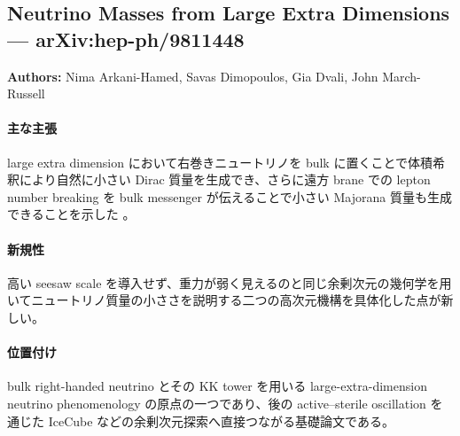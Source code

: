 \subsection{Neutrino Masses from Large Extra Dimensions --- arXiv:hep-ph/9811448}

\textbf{Authors:} Nima Arkani-Hamed, Savas Dimopoulos, Gia Dvali, John March-Russell

\paragraph{主な主張}
large extra dimension において右巻きニュートリノを bulk に置くことで体積希釈により自然に小さい Dirac 質量を生成でき、さらに遠方 brane での lepton number breaking を bulk messenger が伝えることで小さい Majorana 質量も生成できることを示した \cite{ArkaniHamed:1998LEDnu}。

\paragraph{新規性}
高い seesaw scale を導入せず、重力が弱く見えるのと同じ余剰次元の幾何学を用いてニュートリノ質量の小ささを説明する二つの高次元機構を具体化した点が新しい。

\paragraph{位置付け}
bulk right-handed neutrino とその KK tower を用いる large-extra-dimension neutrino phenomenology の原点の一つであり、後の active--sterile oscillation を通じた IceCube などの余剰次元探索へ直接つながる基礎論文である。
